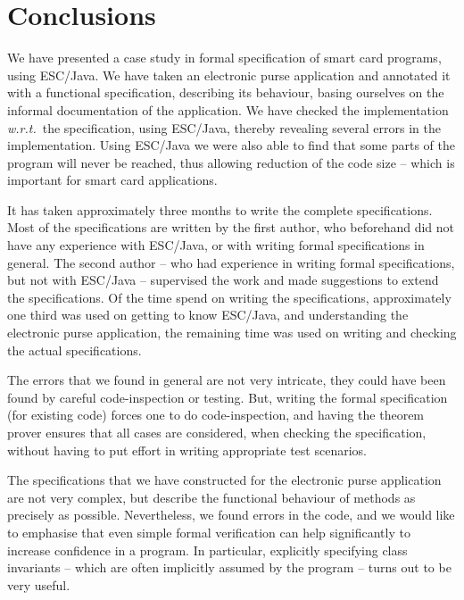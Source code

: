 \documentclass[a4paper]{llncs}
\begin{document}
\section{Conclusions}
\label{SectConcl}

We have presented a case study in formal specification of smart card
programs, using ESC/Java. We have taken an electronic purse
application and annotated it with a functional specification,
describing its behaviour, basing ourselves on the informal
documentation of the application. We have checked the implementation
\emph{w.r.t.}~the specification, using ESC/Java, thereby revealing
several errors in the implementation. Using ESC/Java we were also able 
to find that some parts of the program will never be reached, thus
allowing reduction of the code size -- which is important for smart
card applications. 

It has taken approximately three months to write the complete
specifications. Most of the specifications are written by the first
author, who beforehand did not have any experience with ESC/Java, or
with writing formal specifications in general. The second author --
who had experience in writing formal specifications, but not with
ESC/Java -- supervised the work and made suggestions to extend the
specifications. Of the time spend on writing the specifications,
approximately one third was used on getting to know ESC/Java, and
understanding the electronic purse application, the remaining time was
used on writing and checking the actual specifications.


The errors that we found in general are not very intricate, they could
have been found by careful code-inspection or testing. But, writing
the formal specification (for existing code) forces one to do
code-inspection, and having the theorem prover ensures that all
cases are considered, when checking the specification, without having
to put effort in writing appropriate test scenarios.

The specifications that we have constructed for the electronic purse
application are not very complex, but describe the functional
behaviour of methods as precisely as possible. Nevertheless, we found
errors in the code, and we would like to emphasise that even simple
formal verification can help significantly to increase confidence in a
program. In particular, explicitly specifying class invariants --
which are often implicitly assumed by the program -- turns
out to be very useful.
\end{document}
